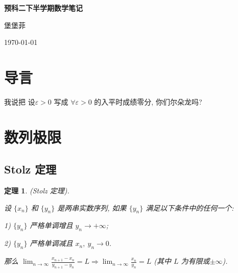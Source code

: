 \documentclass[12pt,a4paper,fontset=none]{ctexart}
\newcounter{theorem_counter}
\theoremstyle{bluehead}
\theoremstyle{greenhead}
\newtheorem{theorem}{定理}[subsection]
\theoremstyle{yellowhead}
\theoremstyle{redhead}
\begin{document}
\begin{titlepage}
\centering
\vspace*{\fill}
\begin{minipage}{\textwidth}
  \centering
  {\Huge\bfseries 预科二下半学期数学笔记\par}
  \vspace{1cm}
  {\Large 堡堡菲\par}
  \vspace{1cm}
    {\large \today\par}
\end{minipage}
\vspace*{\fill}
\end{titlepage}


\tableofcontents
\thispagestyle{empty}
\newpage

\section*{导言}

我说把 设$\varepsilon>0$ 写成 $\forall \varepsilon>0$ 的入平时成绩零分, 你们尔朵龙吗?

\newpage


\section{数列极限}


\subsection{Stolz 定理}

\begin{theorem}
  (Stolz 定理).

  \hspace{-2em}设 $\{x_n\}$ 和 $\{y_n\}$ 是两串实数序列, 如果 $\{y_n\}$ 满足以下条件中的任何一个:

  \vspace{0.1cm}
  
  1) $\{y_n\}$ 严格单调增且 $y_n \to +\infty$;

  \vspace{0.1cm}
  
  2) $\{y_n\}$ 严格单调减且 $x_n,\ y_n \to 0$.

  \vspace{0.2cm}
  
  \hspace{-2em}那么 $\displaystyle \lim_{n \to \infty} \frac{x_{n+1}-x_n}{y_{n+1}-y_n}=L \Rightarrow \lim_{n \to \infty} \frac{x_n}{y_n}=L$ (其中 $L$ 为有限或$\pm \infty$).
\end{theorem}
\end{document}
